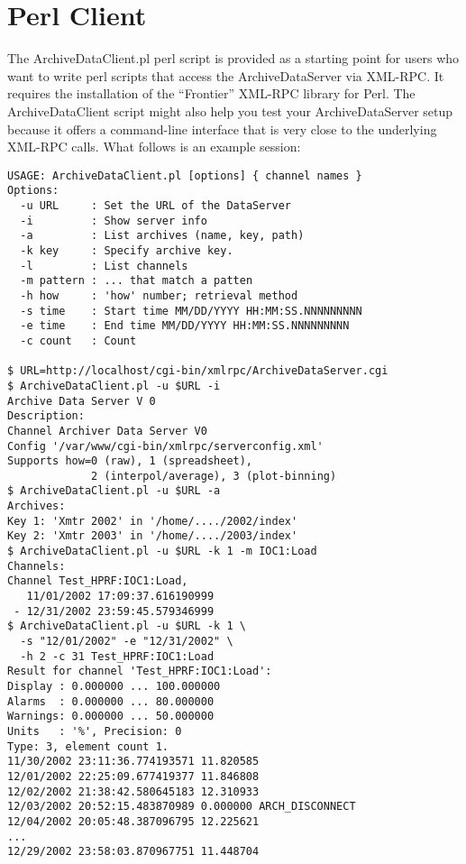 \section{Perl Client}
The ArchiveDataClient.pl perl script is provided as a starting point
for users who want to write perl scripts that access the
ArchiveDataServer via XML-RPC. It requires the installation of the
``Frontier'' XML-RPC library for Perl.  The ArchiveDataClient script
might also help you test your ArchiveDataServer setup because it
offers a command-line interface that is very close to the underlying
XML-RPC calls. What follows is an example session:

\begin{lstlisting}[frame=none,keywordstyle=\sffamily]
USAGE: ArchiveDataClient.pl [options] { channel names } 
Options:
  -u URL     : Set the URL of the DataServer
  -i         : Show server info
  -a         : List archives (name, key, path)
  -k key     : Specify archive key.
  -l         : List channels
  -m pattern : ... that match a patten
  -h how     : 'how' number; retrieval method
  -s time    : Start time MM/DD/YYYY HH:MM:SS.NNNNNNNNN
  -e time    : End time MM/DD/YYYY HH:MM:SS.NNNNNNNNN
  -c count   : Count

$ URL=http://localhost/cgi-bin/xmlrpc/ArchiveDataServer.cgi
$ ArchiveDataClient.pl -u $URL -i
Archive Data Server V 0
Description:
Channel Archiver Data Server V0
Config '/var/www/cgi-bin/xmlrpc/serverconfig.xml'
Supports how=0 (raw), 1 (spreadsheet),
             2 (interpol/average), 3 (plot-binning)
$ ArchiveDataClient.pl -u $URL -a
Archives:
Key 1: 'Xmtr 2002' in '/home/..../2002/index'
Key 2: 'Xmtr 2003' in '/home/..../2003/index'
$ ArchiveDataClient.pl -u $URL -k 1 -m IOC1:Load
Channels:
Channel Test_HPRF:IOC1:Load,
   11/01/2002 17:09:37.616190999
 - 12/31/2002 23:59:45.579346999
$ ArchiveDataClient.pl -u $URL -k 1 \
  -s "12/01/2002" -e "12/31/2002" \
  -h 2 -c 31 Test_HPRF:IOC1:Load
Result for channel 'Test_HPRF:IOC1:Load':
Display : 0.000000 ... 100.000000
Alarms  : 0.000000 ... 80.000000
Warnings: 0.000000 ... 50.000000
Units   : '%', Precision: 0
Type: 3, element count 1.
11/30/2002 23:11:36.774193571 11.820585
12/01/2002 22:25:09.677419377 11.846808
12/02/2002 21:38:42.580645183 12.310933
12/03/2002 20:52:15.483870989 0.000000 ARCH_DISCONNECT
12/04/2002 20:05:48.387096795 12.225621
...
12/29/2002 23:58:03.870967751 11.448704
\end{lstlisting}